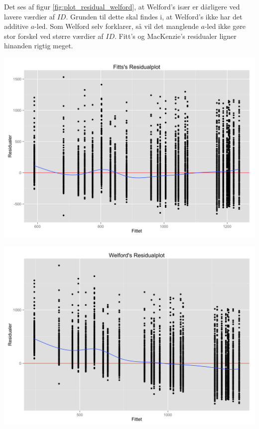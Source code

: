 Det ses af figur \ref{fig:plot_residual_welford}, at Welford's især er dårligere ved lavere værdier af $ID$. Grunden til dette skal findes i, at Welford's ikke har det additive $a$-led. Som Welford \cite{welford1968} selv forklarer, så vil det manglende $a$-led ikke gøre stor forskel ved større værdier af $ID$. Fitt's og MacKenzie's residualer ligner hinanden rigtig meget.

\begin{minipage}{\linewidth}
	\begin{minipage}{.5\linewidth}
		\includegraphics[width=\linewidth]{images/plots/plot_residual_fitt}
		\label{fig:plot_residual_fitt}
	\end{minipage}
	\begin{minipage}{.5\linewidth}
		\includegraphics[width=\linewidth]{images/plots/plot_residual_welford}

\end{minipage}
\end{minipage}

